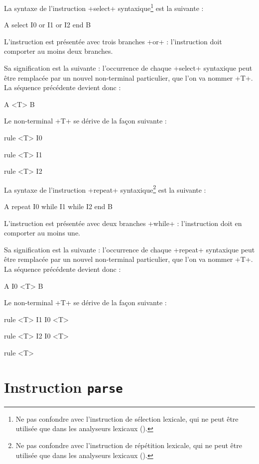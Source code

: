 
La syntaxe de l'instruction \ggst+select+ syntaxique\footnote{Ne pas confondre avec l'instruction de sélection lexicale, qui ne peut être utilisée que dans les analyseurs lexicaux ().} est la suivante :
\begin{galgas3}
A
select
  I0
or
  I1
or
  I2
end
B
\end{galgas3}

L'instruction est présentée avec trois branches \ggst+or+ : l'instruction doit comporter au moins deux branches.

Sa signification est la suivante : l'occurrence de chaque \ggst+select+ syntaxique peut être remplacée par un nouvel non-terminal particulier, que l'on va nommer \ggst+T+. La séquence précédente devient donc :
\begin{galgas3}
A
<T>
B
\end{galgas3}

Le non-terminal \ggst+T+ se dérive de la façon suivante :
\begin{galgas3}
rule <T> { I0 }

rule <T> { I1 }

rule <T> { I2 }
\end{galgas3}








La syntaxe de l'instruction \ggst+repeat+ syntaxique\footnote{Ne pas confondre avec l'instruction de répétition lexicale, qui ne peut être utilisée que dans les analyseurs lexicaux ().} est la suivante :
\begin{galgas3}
A
repeat
  I0
while
  I1
while
  I2
end
B
\end{galgas3}

L'instruction est présentée avec deux branches \ggst+while+ : l'instruction doit en comporter au moins une.

Sa signification est la suivante : l'occurrence de chaque \ggst+repeat+ syntaxique peut être remplacée par un nouvel non-terminal particulier, que l'on va nommer \ggst+T+. La séquence précédente devient donc :
\begin{galgas3}
A
I0
<T>
B
\end{galgas3}

Le non-terminal \ggst+T+ se dérive de la façon suivante :
\begin{galgas3}
rule <T> { I1 I0 <T> }

rule <T> { I2 I0 <T> }

rule <T> {  }
\end{galgas3}







\section{Instruction \texttt{parse}}











